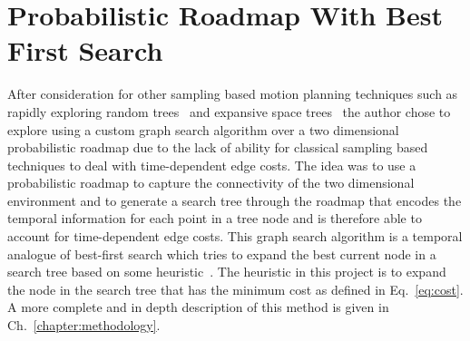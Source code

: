 \section{Probabilistic Roadmap With Best First Search}

\label{sec:finaldesign}

After consideration for other sampling based motion planning techniques such as
rapidly exploring random trees~\cite{rrt} and expansive space trees~\cite{est}
the author chose to explore using a custom graph search algorithm over a two
dimensional probabilistic roadmap due to the lack of ability for classical
sampling based techniques to deal with time-dependent edge costs. The idea was
to use a probabilistic roadmap to capture the connectivity of the two
dimensional environment and to generate a search tree through the roadmap that
encodes the temporal information for each point in a tree node and is therefore
able to account for time-dependent edge costs. This graph search algorithm is a
temporal analogue of best-first search which tries to expand the best current
node in a search tree based on some heuristic~\cite{bestfs}. The heuristic in
this project is to expand the node in the search tree that has the minimum cost
as defined in Eq.~\ref{eq:cost}. A more complete and in depth description of
this method is given in Ch.~\ref{chapter:methodology}.


